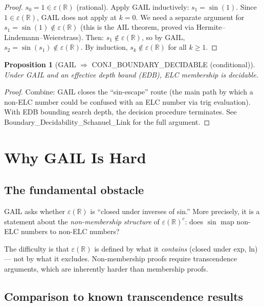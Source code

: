 \documentclass[11pt]{article}
\newtheorem{proposition}[theorem]{Proposition}
\begin{document}
\begin{proof}
$s_0 = 1 \in \varepsilon(\mathbb{R})$ (rational). Apply GAIL inductively:
$s_1 = \sin(1)$. Since $1 \in \varepsilon(\mathbb{R})$, GAIL does not apply at $k=0$.
We need a separate argument for $s_1 = \sin(1) \notin \varepsilon(\mathbb{R})$
(this is the AIL theorem, proved via Hermite--Lindemann--Weierstrass).
Then: $s_1 \notin \varepsilon(\mathbb{R})$, so by GAIL, $s_2 = \sin(s_1) \notin \varepsilon(\mathbb{R})$.
By induction, $s_k \notin \varepsilon(\mathbb{R})$ for all $k \geq 1$.
\end{proof}

\begin{proposition}[GAIL $\Rightarrow$ CONJ\_BOUNDARY\_DECIDABLE (conditional)]
Under GAIL and an effective depth bound (EDB), ELC membership is decidable.
\end{proposition}

\begin{proof}
Combine: GAIL closes the ``sin-escape'' route (the main path by which a
non-ELC number could be confused with an ELC number via trig evaluation).
With EDB bounding search depth, the decision procedure terminates.
See Boundary\_Decidability\_Schanuel\_Link for the full argument.
\end{proof}

\section{Why GAIL Is Hard}

\subsection{The fundamental obstacle}

GAIL asks whether $\varepsilon(\mathbb{R})$ is ``closed under inverses of sin.''
More precisely, it is a statement about the \emph{non-membership structure} of
$\varepsilon(\mathbb{R})^c$: does $\sin$ map non-ELC numbers to non-ELC numbers?

The difficulty is that $\varepsilon(\mathbb{R})$ is defined by what it
\emph{contains} (closed under exp, ln) — not by what it excludes.
Non-membership proofs require transcendence arguments, which are inherently
harder than membership proofs.

\subsection{Comparison to known transcendence results}
\end{document}
